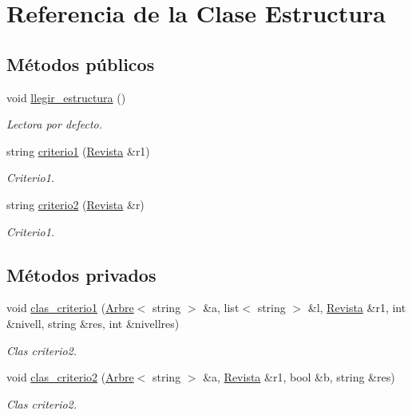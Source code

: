 \hypertarget{class_estructura}{\section{Referencia de la Clase Estructura}
\label{class_estructura}
}
\subsection*{Métodos públicos}
\begin{DoxyCompactItemize}
\item 
void \hyperlink{class_estructura_a5169bd12bdef33436dd75bdf45de18be}{llegir\-\_\-estructura} ()
\begin{DoxyCompactList}\small\item\em Lectora por defecto. \end{DoxyCompactList}\item 
string \hyperlink{class_estructura_a756ee7e893ac64230684b5bec1497f0c}{criterio1} (\hyperlink{class_revista}{Revista} \&r1)
\begin{DoxyCompactList}\small\item\em Criterio1. \end{DoxyCompactList}\item 
string \hyperlink{class_estructura_af185388c4c717a3e77aef744b755a864}{criterio2} (\hyperlink{class_revista}{Revista} \&r)
\begin{DoxyCompactList}\small\item\em Criterio1. \end{DoxyCompactList}\end{DoxyCompactItemize}
\subsection*{Métodos privados}
\begin{DoxyCompactItemize}
\item 
void \hyperlink{class_estructura_a29c1a2b17790a498dfa27bb626a2407f}{clas\-\_\-criterio1} (\hyperlink{class_arbre}{Arbre}$<$ string $>$ \&a, list$<$ string $>$ \&l, \hyperlink{class_revista}{Revista} \&r1, int \&nivell, string \&res, int \&nivellres)
\begin{DoxyCompactList}\small\item\em Clas criterio2. \end{DoxyCompactList}\item 
void \hyperlink{class_estructura_a4bf90d197f1dd7f2ba2df555984fa177}{clas\-\_\-criterio2} (\hyperlink{class_arbre}{Arbre}$<$ string $>$ \&a, \hyperlink{class_revista}{Revista} \&r1, bool \&b, string \&res)
\begin{DoxyCompactList}\small\item\em Clas criterio2. \end{DoxyCompactList}\end{DoxyCompactItemize}
